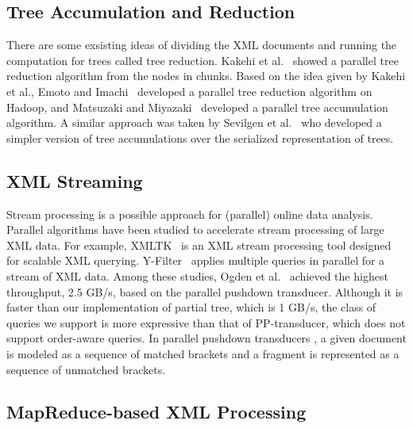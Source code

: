 \subsection{Tree Accumulation and Reduction}

There are some exsisting ideas of dividing the XML documents and running the
computation for trees called tree reduction. Kakehi et al.~\cite{KaME07} showed
a parallel tree reduction algorithm from the nodes in chunks. Based on the idea
given by Kakehi et al., Emoto and Imachi~\cite{EmIm12} developed a parallel tree
reduction algorithm on Hadoop, and Matsuzaki and Miyazaki~\cite{MaMi16}
developed a parallel tree accumulation algorithm. A similar approach was taken
by Sevilgen et al.~\cite{SAFu05} who developed a simpler version of tree
accumulations over the serialized representation of trees.

\subsection{XML Streaming}

Stream processing is a possible approach for (parallel) online data analysis.
Parallel algorithms have been studied to accelerate stream processing
of large XML data. For example, XMLTK~\cite{AGGR02} is an XML stream processing
tool designed for scalable XML querying. Y-Filter~\cite{ZhPC10} applies multiple
queries in parallel for a stream of XML data. Among these studies, Ogden et
al.~\cite{OgTP13} achieved the highest throughput, 2.5 GB/s, based on the
parallel pushdown transducer. Although it is faster than our implementation of
partial tree, which is 1 GB/s, the class of queries we support is more
expressive than that of PP-transducer, which does not support order-aware
queries. In parallel pushdown transducers \cite{LiZZ17}, a given document is
modeled as a sequence of matched brackets and a fragment is represented as a
sequence of unmatched brackets.


\subsection{MapReduce-based XML Processing}
\label{sec:mapreduce}

